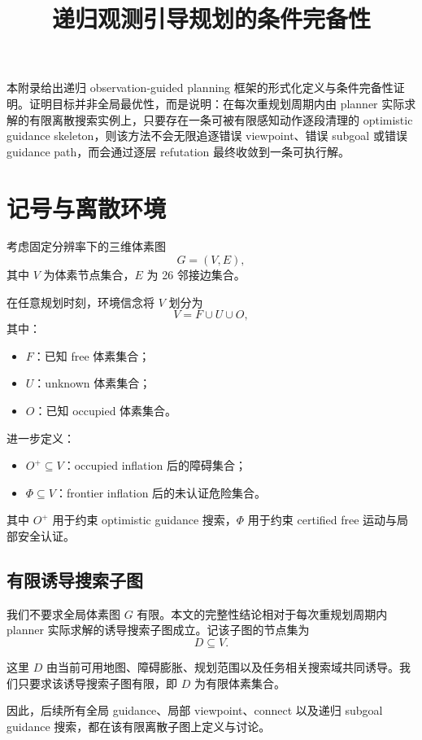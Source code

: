 \documentclass[11pt]{ctexart}
\title{递归观测引导规划的条件完备性}
\author{}
\date{}
\begin{document}
\maketitle

本附录给出递归 observation-guided planning 框架的形式化定义与条件完备性证明。证明目标并非全局最优性，而是说明：在每次重规划周期内由 planner 实际求解的有限离散搜索实例上，只要存在一条可被有限感知动作逐段清理的 optimistic guidance skeleton，则该方法不会无限追逐错误 viewpoint、错误 subgoal 或错误 guidance path，而会通过逐层 refutation 最终收敛到一条可执行解。

\section{记号与离散环境}

考虑固定分辨率下的三维体素图
\[
G=(V,E),
\]
其中 $V$ 为体素节点集合，$E$ 为 26 邻接边集合。

在任意规划时刻，环境信念将 $V$ 划分为
\[
V = F \cup U \cup O,
\]
其中：
\begin{itemize}[leftmargin=2em]
    \item $F$：已知 free 体素集合；
    \item $U$：unknown 体素集合；
    \item $O$：已知 occupied 体素集合。
\end{itemize}

进一步定义：
\begin{itemize}[leftmargin=2em]
    \item $O^{+}\subseteq V$：occupied inflation 后的障碍集合；
    \item $\Phi\subseteq V$：frontier inflation 后的未认证危险集合。
\end{itemize}

其中 $O^{+}$ 用于约束 optimistic guidance 搜索，$\Phi$ 用于约束 certified free 运动与局部安全认证。

\subsection{有限诱导搜索子图}

我们不要求全局体素图 $G$ 有限。本文的完整性结论相对于每次重规划周期内 planner 实际求解的诱导搜索子图成立。记该子图的节点集为
\[
D\subseteq V.
\]

这里 $D$ 由当前可用地图、障碍膨胀、规划范围以及任务相关搜索域共同诱导。我们只要求该诱导搜索子图有限，即 $D$ 为有限体素集合。

因此，后续所有全局 guidance、局部 viewpoint、connect 以及递归 subgoal guidance 搜索，都在该有限离散子图上定义与讨论。
\end{document}
